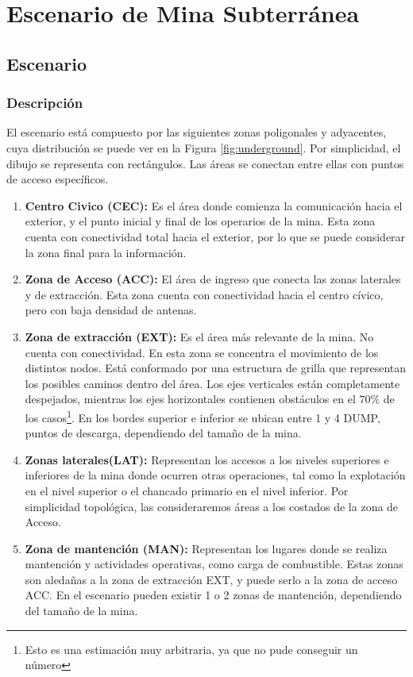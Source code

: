 \documentclass[10pt,preprint,onecolumn]{article}
\begin{document}
\section{Escenario de Mina Subterránea}

\subsection{Escenario}

\subsubsection{Descripción}

El escenario está compuesto por las siguientes zonas poligonales y adyacentes, cuya distribución se puede ver en la Figura \ref{fig:underground}. Por simplicidad, el dibujo se representa con rectángulos. Las áreas se conectan entre ellas con puntos de acceso específicos.

\begin{enumerate}
    \item \textbf{Centro Civico (CEC):} Es el área donde comienza la comunicación hacia el exterior, y el punto inicial y final de los operarios de la mina. Esta zona cuenta con conectividad total hacia el exterior, por lo que se puede considerar la zona final para la información.
    
    \item \textbf{Zona de Acceso (ACC):} El área de ingreso que conecta las zonas laterales y de extracción. Esta zona cuenta con conectividad hacia el centro cívico, pero con baja densidad de antenas.
    
    \item \textbf{Zona de extracción (EXT):} Es el área más relevante de la mina. No cuenta con conectividad. En esta zona se concentra el movimiento de los distintos nodos.
    Está conformado por una estructura de grilla que representan los posibles caminos dentro del área. Los ejes verticales están completamente despejados, mientras los ejes horizontales contienen obstáculos en el $70\%$ de los casos\footnote{Esto es una estimación muy arbitraria, ya que no pude conseguir un número }. En los bordes superior e inferior se ubican entre 1 y 4 DUMP, puntos de descarga, dependiendo del tamaño de la mina.
        
    \item \textbf{Zonas laterales(LAT):} Representan los accesos a los niveles superiores e inferiores de la mina donde ocurren otras operaciones, tal como la explotación en el nivel superior o el chancado primario en el nivel inferior. Por simplicidad topológica, las consideraremos áreas a los costados de la zona de Acceso.

    \item \textbf{Zona de mantención (MAN):} Representan los lugares donde se realiza mantención y actividades operativas, como carga de combustible. Estas zonas son aledañas a la zona de extracción EXT, y puede serlo a la zona de acceso ACC. En el escenario pueden existir 1 o 2 zonas de mantención, dependiendo del tamaño de la mina.
    
\end{enumerate}
\end{document}
